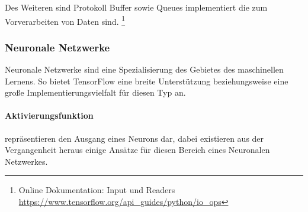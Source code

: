 \noindent
Des Weiteren sind Protokoll Buffer sowie Queues implementiert die zum Vorverarbeiten von Daten sind.
\footnote{Online Dokumentation: Input und Readers \url{https://www.tensorflow.org/api_guides/python/io_ops}}

\subsubsection{Neuronale Netzwerke}

Neuronale Netzwerke sind eine Spezialisierung des Gebietes des maschinellen Lernens. 
So bietet TensorFlow eine breite Unterstützung beziehungsweise eine große Implementierungsvielfalt für diesen Typ an. 

\paragraph{Aktivierungsfunktion} repräsentieren den Ausgang eines Neurons dar, dabei existieren aus der Vergangenheit heraus einige Ansätze für diesen Bereich eines Neuronalen Netzwerkes. 
